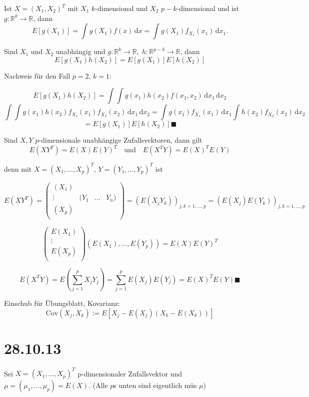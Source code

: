 \documentclass[12pt, a4paper]{article}
\theoremstyle{empty}
\newcommand{\R}{\mathbb{R}}
\newcommand{\1}{\mathds{1}}
\newcommand{\Cov}{\mathrm{Cov}}
\renewcommand{\d}{\,\mathrm{d}}
\providecommand{\mtext}[1]{\quad \text{#1} \quad}
\begin{document}
Ist $X = (X_1, X_2)^T$ mit $X_1$ $k$-dimensional und $X_2$ $p-k$-dimensional und ist $g:\R^k \to \R$, dann 
\[ E[g(X_1)]  = \int g(X_1) f(x) \d x = \int g(X_1)  f_{X_1} (x_1) \d x_1. \]

Sind $X_1$ und $X_2$ unabhängig und $g:\R^k \to \R, \; h:\R^{p-k} \to \R$, dann
\[ E[g(X_1) h(X_2)] = E[g(X_1)]E[h(X_2)]    \]

Nachweis für den Fall $p=2, \, k = 1$:

\[ E[g(X_1) h(X_2)] =  \int \int g(x_1)h(x_2) f(x_1, x_2) \d x_1 \d x_2 \]
\[\int \int g(x_1)h(x_2) f_{X_1} (x_1) f_{X_2}(x_2) \d x_1  \d x_2    = \int g(x_1) f_{X_1} (x_1) \d x_1  \int  h(x_2) f_{X_2} (x_2) \d x_2\]
\[ = E[g(X_1)] E[h(X_2)] \blacksquare  \]


Sind $X,Y$ $p$-dimensionale unabhängige Zufallsvektoren, dann gilt 
\[  E(XY^T) = E(X) E(Y)^T \mtext{und} E(X^T Y) = E(X)^T E(Y)    \]

denn mit $X = (X_1, \ldots, X_p)^T, \, Y=(Y_1, \ldots, Y_p)^T $ ist

\[  E(XY^T) =     \begin{pmatrix}

(X_1)  &  & &  \\
\vdots & (Y_1 & \ldots & Y_n) \\
(X_p) &  & & \\

\end{pmatrix}  = (E(X_jY_k))_{j,k = 1,\ldots,p}  = (E(X_j)E(Y_k))_{j,k = 1, \ldots, p}   \]

\[ \begin{pmatrix}

E(X_1)   \\
\vdots \\
E(X_p) \\

\end{pmatrix} (E(X_1), \ldots, E(Y_p)) = E(X) E(Y)^T  \]

\[ E(X^T Y) = E(\sum_{j=1}^{p} X_j Y_j) = \sum_{j=1}^{p} E(X_j) E(Y_j) = E(X)^T E(Y) \blacksquare  \]


Einschub für Übungsblatt, Kovarianz:
\[  \Cov(X_j, X_k) := E[X_j - E(X_j) (X_k - E(X_k))]  \]




\section{28.10.13}

Sei $ X = (X_1, \dots, X_p)^T $ p-dimensionaler Zufallsvektor und $ \mu = (\mu_1, \dots, \mu_p) = E(X) $. (Alle $p$s unten sind eigentlich müs $\mu$)
\end{document}

